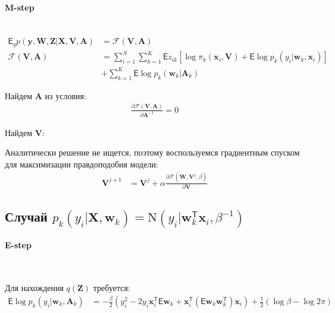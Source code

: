 \documentclass[12pt, twoside]{article}
\numberwithin{equation}{section}
\begin{document}
\paragraph{M-step}~
\begin{equation}
\label{eq:st:7}
\begin{aligned}
\mathsf{E}_{q} p\left(\textbf{y}, \textbf{W}, \textbf{Z}|\textbf{X}, \textbf{V}, \textbf{A}\right) &= \mathcal{F}\left(\textbf{V}, \textbf{A}\right) \\
\mathcal{F}\left(\textbf{V}, \textbf{A}\right) &= \sum_{i=1}^{N}\sum_{k=1}^{K}\mathsf{E}z_{ik}\left[\log\pi_k\left(\textbf{x}_i, \textbf{V}\right) + \mathsf{E}\log p_{k}\left(y_i|\textbf{w}_{k}, \textbf{x}_{i}\right)\right] \\
&+ \sum_{k=1}^{K}\mathsf{E}\log p_{k}\left(\textbf{w}_{k}|\textbf{A}_k\right)
\end{aligned}
\end{equation}

Найдем $\textbf{A}$ из условия:
\begin{equation}
\label{eq:st:8}
\begin{aligned}
\frac{\partial \mathcal{F}\left(\textbf{V}, \textbf{A}\right)}{\partial \textbf{A}^{-1}} = 0 
\end{aligned}
\end{equation}

Найдем $\textbf{V}$:

Аналитически решение не ищется, поэтому воспользуемся градиентным спуском для максимизации правдоподобия модели:
\begin{equation}
\label{eq:st:9}
\begin{aligned}
\textbf{V}^{j+1} &= \textbf{V}^{j} + \alpha\frac{\partial \mathcal{F}\left(\textbf{W}, \textbf{V}^{j}, \beta\right)}{\partial \textbf{V}} 
\end{aligned}
\end{equation}

\subsection{Случай $p_k\left(y_i|\textbf{X}, \textbf{w}_k\right) = \text{N}\left(y_i|\textbf{w}_{k}^{\mathsf{T}}\textbf{x}_i, \beta^{-1}\right)$}

\paragraph{E-step}~

Для нахождения $q\left(\textbf{Z}\right)$ требуется:
\begin{equation}
\label{eq:st:10}
\begin{aligned}
\mathsf{E}\log p_{k}\left(y_{i}|\textbf{w}_k, \textbf{A}_k\right) &= -\frac{\beta}{2}\left(y_{i}^{2}-2y_{i}\textbf{x}_{i}^{\mathsf{T}}\mathsf{E}\textbf{w}_{k}+\textbf{x}_{i}^{\mathsf{T}}\left(\mathsf{E}\textbf{w}_{k}\textbf{w}_{k}^{\mathsf{T}}\right)\textbf{x}_{i}\right) + \frac{1}{2}\left(\log\beta - \log2\pi\right)\\
\end{aligned}
\end{equation}
\end{document}

